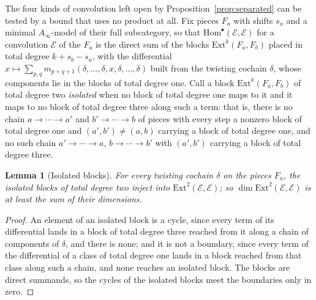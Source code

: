 \documentclass[11pt,reqno]{amsart}
\numberwithin{equation}{section}
\theoremstyle{plain}
\newtheorem{lemma}[theorem]{Lemma}
\theoremstyle{definition}
\newcommand{\Ext}{\mathrm{Ext}}
\newcommand{\Hom}{\mathrm{Hom}}
\begin{document}
The four kinds of convolution left open by Proposition~\ref{prop:separated} can be tested by a bound that uses no product at all. Fix pieces $F_{a}$ with shifts $s_{a}$ and a minimal $A_{\infty}$-model of their full subcategory, so that $\Hom^{\bullet}(\mathcal{E},\mathcal{E})$ for a convolution $\mathcal{E}$ of the $F_{a}$ is the direct sum of the blocks $\Ext^{k}(F_{a},F_{b})$ placed in total degree $k+s_{b}-s_{a}$, with the differential $x\mapsto\sum_{p,q}m_{p+q+1}(\delta,\dots,\delta,x,\delta,\dots,\delta)$ built from the twisting cochain $\delta$, whose components lie in the blocks of total degree one. Call a block $\Ext^{k}(F_{a},F_{b})$ of total degree two \emph{isolated} when no block of total degree one maps to it and it maps to no block of total degree three along such a term: that is, there is no chain $a\to\cdots\to a'$ and $b'\to\cdots\to b$ of pieces with every step a nonzero block of total degree one and $(a',b')\ne(a,b)$ carrying a block of total degree one, and no such chain $a'\to\cdots\to a$, $b\to\cdots\to b'$ with $(a',b')$ carrying a block of total degree three.

\begin{lemma}[Isolated blocks]\label{lem:isolated}
For every twisting cochain $\delta$ on the pieces $F_{a}$, the isolated blocks of total degree two inject into $\Ext^{2}(\mathcal{E},\mathcal{E})$; so $\dim\Ext^{2}(\mathcal{E},\mathcal{E})$ is at least the sum of their dimensions.
\end{lemma}

\begin{proof}
An element of an isolated block is a cycle, since every term of its differential lands in a block of total degree three reached from it along a chain of components of $\delta$, and there is none; and it is not a boundary, since every term of the differential of a class of total degree one lands in a block reached from that class along such a chain, and none reaches an isolated block. The blocks are direct summands, so the cycles of the isolated blocks meet the boundaries only in zero.
\end{proof}
\end{document}
